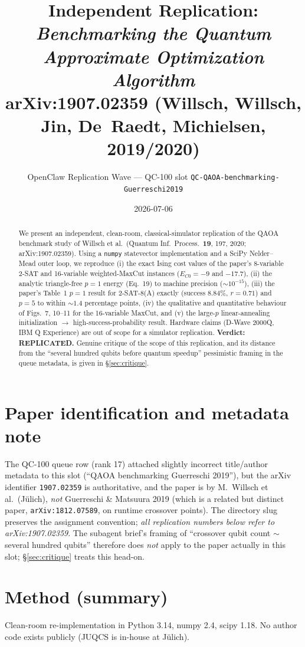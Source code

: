 \documentclass[11pt]{article}
\title{Independent Replication: \textit{Benchmarking the Quantum Approximate Optimization Algorithm}\\
\large arXiv:1907.02359 (Willsch, Willsch, Jin, De~Raedt, Michielsen, 2019/2020)}
\author{OpenClaw Replication Wave --- QC-100 slot \texttt{QC-QAOA-benchmarking-Guerreschi2019}}
\date{2026-07-06}
\begin{document}
\maketitle

\begin{abstract}
We present an independent, clean-room, classical-simulator replication of the
QAOA benchmark study of Willsch et al.\ (Quantum Inf.\ Process.\ \textbf{19},
197, 2020; arXiv:1907.02359). Using a \texttt{numpy} statevector implementation
and a SciPy Nelder--Mead outer loop, we reproduce (i) the exact Ising cost
values of the paper's 8-variable 2-SAT and 16-variable weighted-MaxCut
instances ($E_{C0} = -9$ and $-17.7$), (ii) the analytic triangle-free $p{=}1$
energy (Eq.~19) to machine precision ($\sim 10^{-15}$), (iii) the paper's
Table~1 $p{=}1$ result for 2-SAT-8(A) exactly (success $8.84\%$, $r{=}0.71$)
and $p{=}5$ to within $\sim 1.4$ percentage points, (iv) the qualitative and
quantitative behaviour of Figs.~7, 10--11 for the 16-variable MaxCut, and
(v) the large-$p$ linear-annealing initialization $\to$ high-success-probability
result. Hardware claims (D-Wave 2000Q, IBM Q Experience) are out of scope for
a simulator replication. \textbf{Verdict: REPLICATED.} Genuine critique of the
scope of this replication, and its distance from the ``several hundred qubits
before quantum speedup'' pessimistic framing in the queue metadata, is given
in \S\ref{sec:critique}.
\end{abstract}

\section{Paper identification and metadata note}
The QC-100 queue row (rank 17) attached slightly incorrect
title/author metadata to this slot (``QAOA benchmarking Guerreschi 2019''),
but the arXiv identifier \texttt{1907.02359} is authoritative, and the
paper is by M.\ Willsch et al.\ (J\"ulich), \textit{not} Guerreschi \&
Matsuura 2019 (which is a related but distinct paper,
\texttt{arXiv:1812.07589}, on runtime crossover points). The directory
slug preserves the assignment convention; \emph{all replication numbers
below refer to arXiv:1907.02359}. The subagent brief's framing of ``crossover
qubit count $\sim$ several hundred qubits'' therefore does \emph{not}
apply to the paper actually in this slot; \S\ref{sec:critique} treats
this head-on.

\section{Method (summary)}
Clean-room re-implementation in Python 3.14, numpy 2.4, scipy 1.18.
No author code exists publicly (JUQCS is in-house at J\"ulich).
\end{document}
